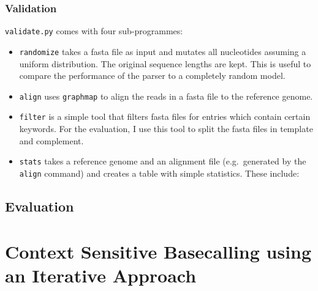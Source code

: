 \documentclass[]{scrartcl}
\begin{document}
\subsubsection{Validation}
\texttt{validate.py} comes with four sub-programmes:
\begin{itemize}
\item \texttt{randomize} takes a fasta file as input and mutates all nucleotides assuming a uniform distribution. The original sequence lengths are kept. This is useful to compare the performance of the parser to a completely random model. 
\item \texttt{align} uses \texttt{graphmap} to align the reads in a fasta file to the reference genome. 
\item \texttt{filter} is a simple tool that filters fasta files for entries which contain certain keywords. For the evaluation, I use this tool to split the fasta files in template and complement. 
\item \texttt{stats} takes a reference genome and an alignment file (e.g.\ generated by the \texttt{align} command) and creates a table with simple statistics. These include: 
\end{itemize}

\subsection{Evaluation}


\section{Context Sensitive Basecalling using an Iterative Approach}
\end{document}
